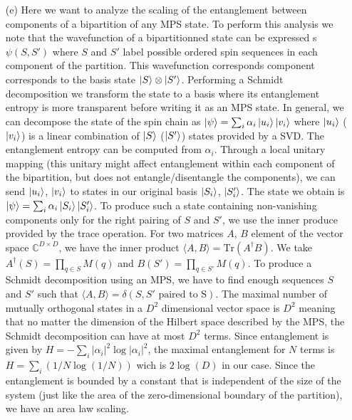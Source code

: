 \documentclass[10pt, a4paper]{article}
\begin{document}
{\begin{enumerate}
  \item[(e)] Here we want to analyze the scaling of the entanglement between components of a bipartition of any MPS state. To perform this analysis we note that the wavefunction of a bipartitionned state can be expressed s $\psi(S, S')$ where $S$ and $S'$ label possible ordered spin sequences in each component of the partition. This wavefunction corresponds component corresponds to the basis state $\ket{S}\otimes\ket{S'}$. Performing a Schmidt decomposition we transform the state to a basis where its entanglement entropy is more transparent before writing it as an MPS state. In general, we can decompose the state of the spin chain as $\ket{\psi} = \sum_{i} \alpha_i \ket{u_i}\ket{v_i}$ where $\ket{u_i}$ ($\ket{v_i}$) is a linear combination of $\ket{S}$ ($\ket{S'}$) states provided by a SVD. The entanglement entropy can be computed from $\alpha_i$. Through a local unitary mapping (this unitary might affect entanglement within each component of the bipartition, but does not entangle/disentangle the components), we can send $\ket{u_i}$, $\ket{v_i}$ to states in our original basis $\ket{S_i}$, $\ket{S_i'}$. The state we obtain is $\ket{\psi} = \sum_{i} \alpha_i \ket{S_i}\ket{S_i'}$. To produce such a state containing non-vanishing components only for the right pairing of $S$ and $S'$, we use the inner produce provided by the trace operation. For two matrices $A$, $B$ element of the vector space $\mathbb{C}^{D\times D}$, we have the inner product $\langle A, B \rangle = \text{Tr}(A^\dagger B)$. We take $A^\dagger(S) = \prod_{q \in S} M(q)$ and $B(S') = \prod_{q \in S'} M(q)$. To produce a Schmidt decomposition using an MPS, we have to find enough sequences $S$ and $S'$ such that $\langle A, B \rangle = \delta(S, S' \text{ paired to S})$. The maximal number of mutually orthogonal states in a $D^2$ dimensional vector space is $D^2$ meaning that no matter the dimension of the Hilbert space described by the MPS, the Schmidt decomposition can have at most $D^2$ terms. Since entanglement is given by $H = -\sum_i |\alpha_i|^2 \log |\alpha_i|^2$, the maximal entanglement for $N$ terms is $H = \sum_i (1/N \log (1/N))$ wich is $2\log(D)$ in our case. Since the entanglement is bounded by a constant that is independent of the size of the system (just like the area of the zero-dimensional boundary of the partition), we have an area law scaling.  
\end{enumerate}
\newpage
}
\end{document}
